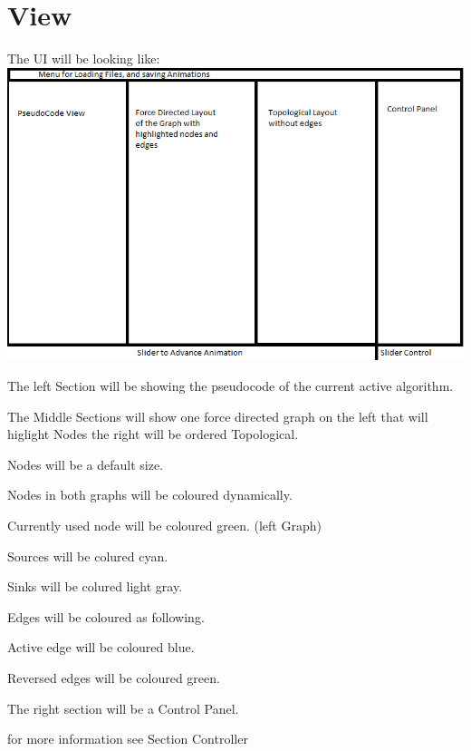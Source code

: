 \section{View}
The UI will be looking like: \\
\includegraphics[width=\textwidth]{parts/UIFinished}
\begin{list}{-}{}
\item The left Section will be showing the pseudocode of the current active algorithm.
\item The Middle Sections will show one force directed  graph on the left that will higlight Nodes the right will be ordered Topological.

\item Nodes will be a default size.
\item Nodes in both graphs will be coloured dynamically.
\begin{list}{-}{}
\item Currently used node will be coloured green. (left Graph)
\item Sources will be colured cyan.
\item Sinks will be colured light gray.
\end{list}
\item Edges will be coloured as following.
\begin{list}{-}{}
\item Active edge will be coloured blue.
\item Reversed edges will be coloured green.
\end{list}
\item The right section will be a Control Panel.
\begin{list}{-}{}
\item for more information see Section Controller

\end{list}
\end{list}




